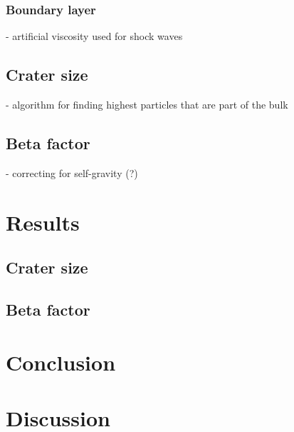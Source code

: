 \documentclass{article}
\begin{document}
			\subsubsection{Boundary layer}
			- artificial viscosity used for shock waves			
		\subsection{Crater size}
		- algorithm for finding highest particles that are part of the bulk
		\subsection{Beta factor}
		- correcting for self-gravity (?)
	\section{Results}
		\subsection{Crater size}
		\subsection{Beta factor}
	\section{Conclusion}
	\section{Discussion}
	
	\newpage 
	\printbibliography
 
\end{document}
